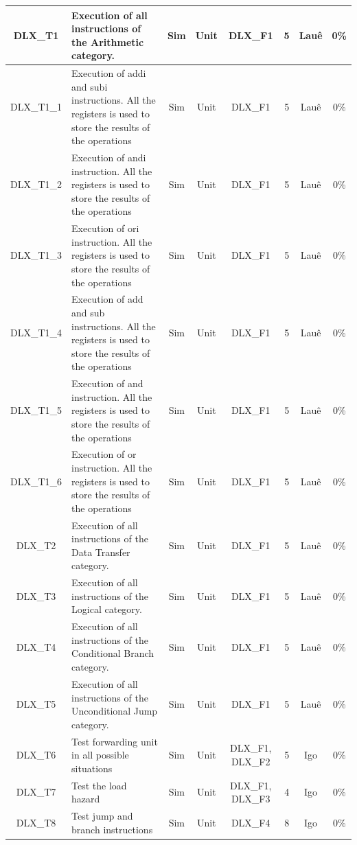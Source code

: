 \documentclass{article}
\begin{document}
\begin{landscape}
\begin{center}
\begin{longtable}[pos]{| c | m{5cm} | c | c | c | c | c | c |}
        \hline
        \endlastfoot
      	DLX\_T1      & Execution of all instructions of the Arithmetic category.  &	Sim & Unit & DLX\_F1 & 5 & Lauê & 0\% \\ \hline   
        DLX\_T1\_1    & Execution of addi and subi instructions. All the registers is used to store the results of the operations   &	Sim & Unit & DLX\_F1 & 5 & Lauê & 0\% \\ \hline	
        DLX\_T1\_2    & Execution of andi instruction. All the registers is used to store the results of the operations   &	Sim & Unit & DLX\_F1 & 5 & Lauê & 0\% \\ \hline	
        DLX\_T1\_3    & Execution of ori instruction. All the registers is used to store the results of the operations   &	Sim & Unit & DLX\_F1 & 5 & Lauê & 0\% \\ \hline	
        DLX\_T1\_4    & Execution of add and sub instructions. All the registers is used to store the results of the operations   &	Sim & Unit & DLX\_F1 & 5 & Lauê & 0\% \\ \hline	
        DLX\_T1\_5    & Execution of and instruction. All the registers is used to store the results of the operations   &	Sim & Unit & DLX\_F1 & 5 & Lauê & 0\% \\ \hline	
        DLX\_T1\_6    & Execution of or instruction. All the registers is used to store the results of the operations   &	Sim & Unit & DLX\_F1 & 5 & Lauê & 0\% \\ \hline
      	DLX\_T2      & Execution of all instructions of the Data Transfer category.  &	Sim & Unit & DLX\_F1 & 5 & Lauê & 0\% \\ \hline   	
      	DLX\_T3      & Execution of all instructions of the Logical category.   &	Sim & Unit & DLX\_F1 & 5 & Lauê & 0\% \\ \hline   
      	DLX\_T4      & Execution of all instructions of the Conditional Branch category.   &	Sim & Unit & DLX\_F1 & 5 & Lauê & 0\% \\ \hline   
      	DLX\_T5      & Execution of all instructions of the Unconditional Jump category.  &	Sim & Unit & DLX\_F1 & 5 & Lauê & 0\% \\ \hline    
		DLX\_T6      & Test forwarding unit in all possible situations  &	Sim & Unit & DLX\_F1, DLX\_F2 & 5 & Igo & 0\% \\ \hline   
		DLX\_T7      & Test the load hazard  &	Sim & Unit & DLX\_F1, DLX\_F3 & 4 & Igo & 0\% \\ \hline   
		DLX\_T8      & Test jump and branch instructions  &	Sim & Unit & DLX\_F4 & 8 & Igo & 0\% \\ \hline        

\end{longtable}
\end{center}
\end{landscape}
\end{document}
